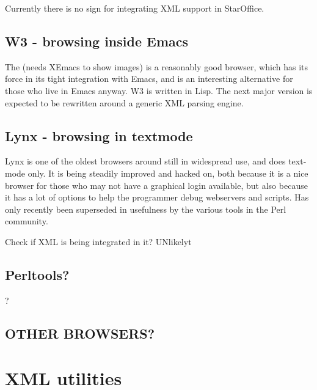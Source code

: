 Currently there is no sign for integrating XML support in StarOffice.

\subsection{W3 - browsing inside Emacs}
\label{sec:w3-browsing-inside-emacs}

The  (needs XEmacs to show images) is a reasonably good browser,
which has its force in its tight integration with Emacs, and is an
interesting alternative for those who live in Emacs anyway.  W3 is
written in Lisp.  The next major version is expected to be rewritten
around a generic XML parsing engine.


\subsection{Lynx - browsing in textmode}
\label{sec:lynx-browsing-in-textmode}

Lynx is one of the oldest browsers around still in widespread use, and
does text-mode only.  It is being steadily improved and hacked on,
both because it is a nice browser for those who may not have a
graphical login available, but also because it has a lot of options to
help the programmer debug webservers and scripts.  Has only recently
been superseded in usefulness by the various tools in the Perl
community.

\textsf{Check if XML is being integrated in it?  UNlikelyt}


\subsection{Perltools?}
\textsf{?}

\subsection{\textsf{OTHER BROWSERS?}}



\section{XML utilities}





